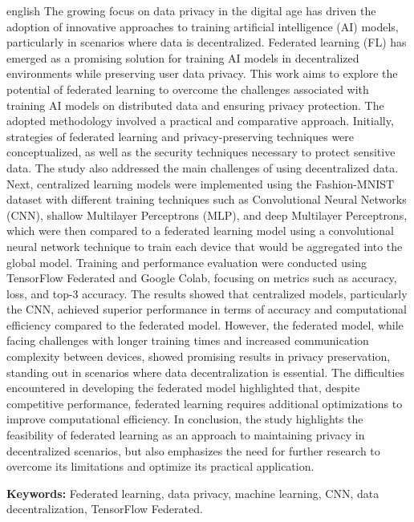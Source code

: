 \begin{resumo}[Abstract]
 \begin{otherlanguage*}{english}
  The growing focus on data privacy in the digital age has driven the adoption of innovative approaches to training artificial intelligence (AI) models, particularly in scenarios where data is decentralized. Federated learning (FL) has emerged as a promising solution for training AI models in decentralized environments while preserving user data privacy. This work aims to explore the potential of federated learning to overcome the challenges associated with training AI models on distributed data and ensuring privacy protection. The adopted methodology involved a practical and comparative approach. Initially, strategies of federated learning and privacy-preserving techniques were conceptualized, as well as the security techniques necessary to protect sensitive data. The study also addressed the main challenges of using decentralized data. Next, centralized learning models were implemented using the Fashion-MNIST dataset with different training techniques such as Convolutional Neural Networks (CNN), shallow Multilayer Perceptrons (MLP), and deep Multilayer Perceptrons, which were then compared to a federated learning model using a convolutional neural network technique to train each device that would be aggregated into the global model. Training and performance evaluation were conducted using TensorFlow Federated and Google Colab, focusing on metrics such as accuracy, loss, and top-3 accuracy. The results showed that centralized models, particularly the CNN, achieved superior performance in terms of accuracy and computational efficiency compared to the federated model. However, the federated model, while facing challenges with longer training times and increased communication complexity between devices, showed promising results in privacy preservation, standing out in scenarios where data decentralization is essential. The difficulties encountered in developing the federated model highlighted that, despite competitive performance, federated learning requires additional optimizations to improve computational efficiency. In conclusion, the study highlights the feasibility of federated learning as an approach to maintaining privacy in decentralized scenarios, but also emphasizes the need for further research to overcome its limitations and optimize its practical application.

    \vspace{\onelineskip}
 
    \noindent 
    \textbf{Keywords:} Federated learning, data privacy, machine learning, CNN, data decentralization, TensorFlow Federated.
 \end{otherlanguage*}
\end{resumo}
